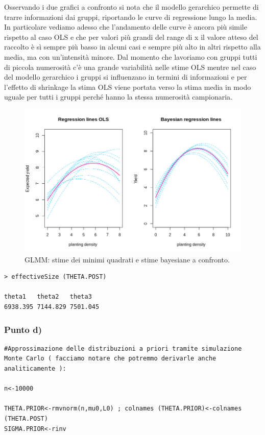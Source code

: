 Osservando i due grafici a confronto si nota che il modello gerarchico permette 
di trarre informazioni dai gruppi, 
riportando le curve di regressione lungo la media. 
In particolare vediamo adesso che l'andamento delle curve è ancora più simile 
rispetto al caso OLS e che per valori più grandi del range di x il valore 
atteso del raccolto è sì sempre più basso in alcuni casi e sempre più alto in 
altri rispetto alla media, ma con un'intensità minore. 
Dal momento che lavoriamo con gruppi tutti di piccola numerosità c'è una grande 
variabilità nelle stime OLS mentre nel caso del modello gerarchico i gruppi si 
influenzano in termini di informazioni e per l'effetto di shrinkage la stima OLS 
viene portata verso la stima media in modo uguale per tutti i gruppi perché hanno 
la stessa numerosità campionaria.
\begin{figure}
    \centering
    \includegraphics[totalheight=8cm]{img/esercizio11-2-2.png}
    \caption{ GLMM: stime dei minimi quadrati e stime bayesiane a confronto.}
\end{figure}
\newpage
{
\color{red}
\begin{Verbatim}
> effectiveSize (THETA.POST)

theta1   theta2   theta3  
6938.395 7144.829 7501.045 
\end{Verbatim}
}

\subsubsection*{Punto d)}
\begin{lstlisting}[style=R]
#Approssimazione delle distribuzioni a priori tramite simulazione Monte Carlo ( facciamo notare che potremmo derivarle anche analiticamente ):

n<-10000

THETA.PRIOR<-rmvnorm(n,mu0,L0) ; colnames (THETA.PRIOR)<-colnames (THETA.POST)
SIGMA.PRIOR<-rinv
\end{lstlisting}

